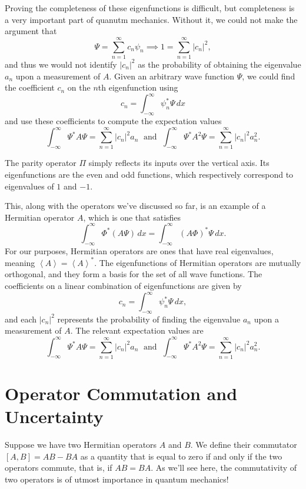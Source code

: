 \documentclass[../p052main.tex]{subfiles}
\begin{document}
Proving the completeness of these eigenfunctions is difficult, but completeness is a very important part of quanutm mechanics.
Without it, we could not make the argument that
\[ \Psi = \sum_{n=1}^{\infty} c_n \psi_n \implies 1 = \sum_{n=1}^{\infty} |c_n|^2, \]
and thus we would not identify $|c_n|^2$ as the probability of obtaining the eigenvalue $a_n$ upon a measurement of $A$.
Given an arbitrary wave function $\Psi$, we could find the coefficient $c_n$ on the $n$th eigenfunction using
\[ c_n = \int_{-\infty}^{\infty} \psi_n^* \Psi \,dx \]
and use these coefficients to compute the expectation values
\[ \int_{-\infty}^{\infty} \Psi^* A \Psi = \sum_{n=1}^{\infty} |c_n|^2 a_n \;\text{ and }\; \int_{-\infty}^{\infty} \Psi^* A^2 \Psi = \sum_{n=1}^{\infty} |c_n|^2 a_n^2. \]

\begin{summary}
    The parity operator $\Pi$ simply reflects its inputs over the vertical axis.
    Its eigenfunctions are the even and odd functions, which respectively correspond to eigenvalues of $1$ and $-1$.

    This, along with the operators we've discussed so far, is an example of a Hermitian operator $A$, which is one that satisfies
    \[ \int_{-\infty}^{\infty} \Phi^* \left( A \Psi \right) \,dx = \int_{-\infty}^{\infty} \left( A \Phi \right)^* \Psi \,dx. \]
    For our purposes, Hermitian operators are ones that have real eigenvalues, meaning $\left< A \right> = \left< A \right>^*$.
    The eigenfunctions of Hermitian operators are mutually orthogonal, and they form a basis for the set of all wave functions.
    The coefficients on a linear combination of eigenfunctions are given by
    \[ c_n = \int_{-\infty}^{\infty} \psi_n^* \Psi \,dx, \]
    and each $|c_n|^2$ represents the probability of finding the eigenvalue $a_n$ upon a measurement of $A$.
    The relevant expectation values are
    \[ \int_{-\infty}^{\infty} \Psi^* A \Psi = \sum_{n=1}^{\infty} |c_n|^2 a_n \;\text{ and }\; \int_{-\infty}^{\infty} \Psi^* A^2 \Psi = \sum_{n=1}^{\infty} |c_n|^2 a_n^2. \]
\end{summary}

\section{Operator Commutation and Uncertainty}
Suppose we have two Hermitian operators $A$ and $B$.
We define their commutator $[A,B] = AB - BA$ as a quantity that is equal to zero if and only if the two operators commute, that is, if $AB = BA$.
As we'll see here, the commutativity of two operators is of utmost importance in quantum mechanics!
\end{document}
